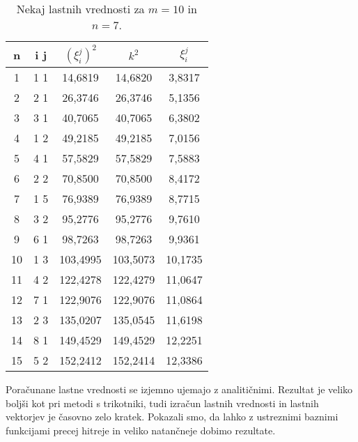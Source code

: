 \documentclass[12pt,a4paper]{article}
\begin{document}
\begin{table}[H]
\begin{center}
\begin{tabular}{|c|c|c|c|c|}
\hline
n & i j & $(\xi ^{j}_i)^{2}$ & $k^{2}$  & $\xi ^{j} _i$ \\ \hline
1 & 1 1 & 14,6819                    & 14,6820  & 3,8317        \\ \hline
2 & 2 1 & 26,3746                   & 26,3746 & 5,1356        \\ \hline
3 & 3 1 &   40,7065                 & 40,7065 & 6,3802        \\ \hline
4 & 1 2 & 49,2185                   & 49,2185 & 7,0156        \\ \hline
5 & 4 1 & 57,5829                  & 57,5829 & 7,5883        \\ \hline
6 & 2 2 & 70,8500                   & 70,8500 & 8,4172        \\ \hline
7 & 1 5 &  76,9389                  & 76,9389 & 8,7715        \\ \hline
8 & 3 2 & 95,2776                  & 95,2776 & 9,7610       \\ \hline
9 & 6 1 & 98,7263                   & 98,7263 & 9,9361        \\ \hline
10 & 1 3 & 103,4995                   & 103,5073 & 10,1735        \\ \hline
11 & 4 2 & 122,4278                  & 122,4279 & 11,0647        \\ \hline
12 & 7 1 & 122,9076                   & 122,9076 & 11,0864        \\ \hline
13 & 2 3 & 135,0207                  & 135,0545 & 11,6198         \\ \hline
14 & 8 1 & 149,4529                   & 149,4529 & 12,2251        \\ \hline
15 & 5 2 & 152,2412                  & 152,2414 & 12,3386        \\ \hline
\end{tabular}
\caption{Nekaj lastnih vrednosti za $m=10$ in $n=7$.}
\label{table:tabela3}
\end{center}
\end{table}

\noindent Poračunane lastne vrednosti se izjemno ujemajo z analitičnimi. Rezultat je veliko boljši kot pri metodi s trikotniki, tudi izračun lastnih vrednosti in lastnih vektorjev je časovno zelo kratek. Pokazali smo, da lahko z ustreznimi baznimi funkcijami precej hitreje in veliko natančneje dobimo rezultate.
\end{document}
